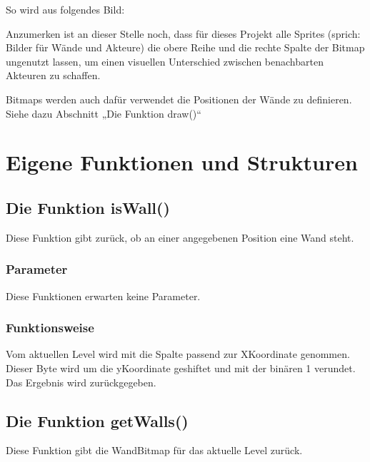 \documentclass[letterpaper,10pt,ngerman]{sphinxmanual}
\let\sphinxpxdimen\pdfpxdimen\else\newdimen\sphinxpxdimen
\begin{document}
So wird aus  folgendes
Bild:

\noindent\sphinxincludegraphics[width=400\sphinxpxdimen]{{skull}.png}

Anzumerken ist an dieser Stelle noch, dass für dieses Projekt alle Sprites
(sprich: Bilder für Wände und Akteure) die obere Reihe und die rechte Spalte
der Bitmap ungenutzt lassen, um einen visuellen Unterschied zwischen
benachbarten Akteuren zu schaffen.

Bitmaps werden auch dafür verwendet die Positionen der Wände zu definieren.
Siehe dazu Abschnitt „Die Funktion draw()“


\section{Eigene Funktionen und Strukturen}
\label{\detokenize{programming:eigene-funktionen-und-strukturen}}

\subsection{Die Funktion isWall()}
\label{\detokenize{programming:die-funktion-iswall}}
Diese Funktion gibt zurück, ob an einer angegebenen Position eine Wand steht.


\subsubsection{Parameter}
\label{\detokenize{programming:parameter}}
Diese Funktionen erwarten keine Parameter.


\subsubsection{Funktionsweise}
\label{\detokenize{programming:funktionsweise}}
Vom aktuellen Level wird mit  die Spalte passend zur
X\sphinxhyphen{}Koordinate genommen. Dieser Byte wird um die y\sphinxhyphen{}Koordinate geshiftet und mit
der binären 1 verundet. Das Ergebnis wird zurückgegeben.


\subsection{Die Funktion getWalls()}
\label{\detokenize{programming:die-funktion-getwalls}}
Diese Funktion gibt die Wand\sphinxhyphen{}Bitmap für das aktuelle Level zurück.
\end{document}
